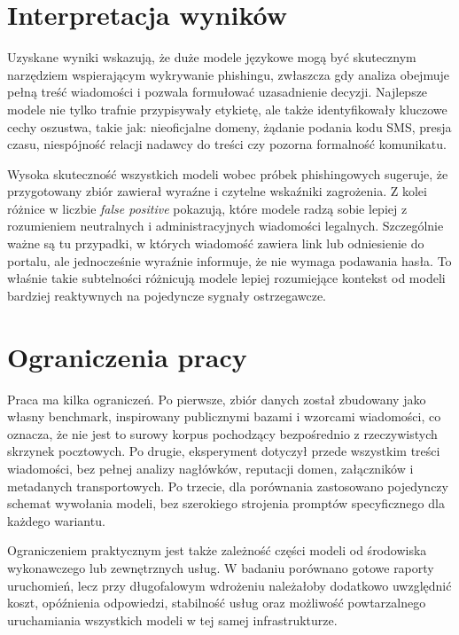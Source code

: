 \documentclass[12pt,a4paper,openany]{report}
\begin{document}
\section{Interpretacja wyników}

Uzyskane wyniki wskazują, że duże modele językowe mogą być skutecznym narzędziem wspierającym wykrywanie phishingu, zwłaszcza gdy analiza obejmuje pełną treść wiadomości i pozwala formułować uzasadnienie decyzji. Najlepsze modele nie tylko trafnie przypisywały etykietę, ale także identyfikowały kluczowe cechy oszustwa, takie jak: nieoficjalne domeny, żądanie podania kodu SMS, presja czasu, niespójność relacji nadawcy do treści czy pozorna formalność komunikatu.

Wysoka skuteczność wszystkich modeli wobec próbek phishingowych sugeruje, że przygotowany zbiór zawierał wyraźne i czytelne wskaźniki zagrożenia. Z kolei różnice w liczbie \textit{false positive} pokazują, które modele radzą sobie lepiej z rozumieniem neutralnych i administracyjnych wiadomości legalnych. Szczególnie ważne są tu przypadki, w których wiadomość zawiera link lub odniesienie do portalu, ale jednocześnie wyraźnie informuje, że nie wymaga podawania hasła. To właśnie takie subtelności różnicują modele lepiej rozumiejące kontekst od modeli bardziej reaktywnych na pojedyncze sygnały ostrzegawcze.

\section{Ograniczenia pracy}

Praca ma kilka ograniczeń. Po pierwsze, zbiór danych został zbudowany jako własny benchmark, inspirowany publicznymi bazami i wzorcami wiadomości, co oznacza, że nie jest to surowy korpus pochodzący bezpośrednio z rzeczywistych skrzynek pocztowych. Po drugie, eksperyment dotyczył przede wszystkim treści wiadomości, bez pełnej analizy nagłówków, reputacji domen, załączników i metadanych transportowych. Po trzecie, dla porównania zastosowano pojedynczy schemat wywołania modeli, bez szerokiego strojenia promptów specyficznego dla każdego wariantu.

Ograniczeniem praktycznym jest także zależność części modeli od środowiska wykonawczego lub zewnętrznych usług. W badaniu porównano gotowe raporty uruchomień, lecz przy długofalowym wdrożeniu należałoby dodatkowo uwzględnić koszt, opóźnienia odpowiedzi, stabilność usług oraz możliwość powtarzalnego uruchamiania wszystkich modeli w tej samej infrastrukturze.
\end{document}
